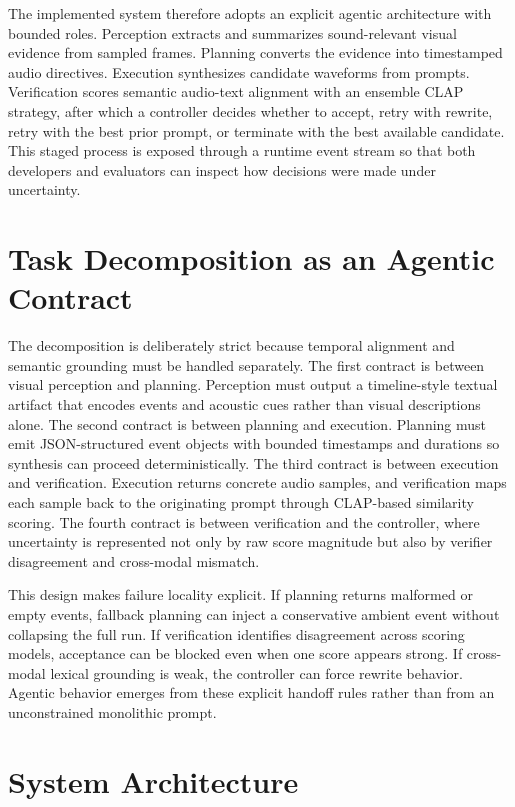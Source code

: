 \documentclass[12pt]{article}
\begin{document}
The implemented system therefore adopts an explicit agentic architecture with bounded roles. Perception extracts and summarizes sound-relevant visual evidence from sampled frames. Planning converts the evidence into timestamped audio directives. Execution synthesizes candidate waveforms from prompts. Verification scores semantic audio-text alignment with an ensemble CLAP strategy, after which a controller decides whether to accept, retry with rewrite, retry with the best prior prompt, or terminate with the best available candidate. This staged process is exposed through a runtime event stream so that both developers and evaluators can inspect how decisions were made under uncertainty.

\section{Task Decomposition as an Agentic Contract}

The decomposition is deliberately strict because temporal alignment and semantic grounding must be handled separately. The first contract is between visual perception and planning. Perception must output a timeline-style textual artifact that encodes events and acoustic cues rather than visual descriptions alone. The second contract is between planning and execution. Planning must emit JSON-structured event objects with bounded timestamps and durations so synthesis can proceed deterministically. The third contract is between execution and verification. Execution returns concrete audio samples, and verification maps each sample back to the originating prompt through CLAP-based similarity scoring. The fourth contract is between verification and the controller, where uncertainty is represented not only by raw score magnitude but also by verifier disagreement and cross-modal mismatch.

This design makes failure locality explicit. If planning returns malformed or empty events, fallback planning can inject a conservative ambient event without collapsing the full run. If verification identifies disagreement across scoring models, acceptance can be blocked even when one score appears strong. If cross-modal lexical grounding is weak, the controller can force rewrite behavior. Agentic behavior emerges from these explicit handoff rules rather than from an unconstrained monolithic prompt.

\section{System Architecture}
\end{document}
